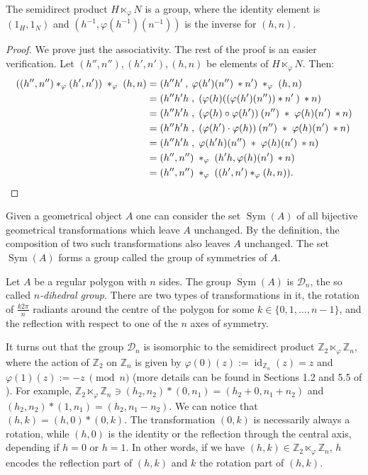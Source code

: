 \documentclass[mat1]{fmfdeloTS2.0}
\newcommand{\Z}{\mathbb Z}
\DeclareMathOperator{\id}{\mathrm{id}}			%
\DeclareMathOperator{\Sym}{\mathrm{Sym}}		%
\begin{document}
\begin{proposition}
The semidirect product $H\ltimes_{\varphi} N$ is a group, where the identity element is $(1_H,1_N)$ and $(h^{-1},\varphi(h^{-1})(n^{-1}))$ is the inverse for $(h,n)$.
\end{proposition}
\begin{proof}
We prove just the associativity. The rest of the proof is an easier verification.
Let $(h'',n''),(h',n'),(h,n)$ be elements of $H\ltimes_\varphi N$. Then:
\begin{align*}
((h'',n'')*_\varphi(h',n'))\;*_\varphi\;(h,n)  &=(h''h'\:,\:\varphi(h')(n'')\:*n')\;*_\varphi\;(h,n) \\
      &= (h''h'h\;,\;(\varphi(h)((\varphi(h')(n''))*n'\:)\:*n)	\\
      &= (h''h'h\;,\;(\varphi(h)\circ\varphi(h'))\:(n'')\;*\;\varphi(h)(n')\:*n)	 \\
      &= (h''h'h\;,\;(\varphi(h')\cdot\varphi(h))\:(n'')\;*\;\varphi(h)(n')\:*n)	\\
      &= (h''h'h\;,\;\varphi(h'h)(n'')\;*\;\varphi(h)(n')\:*n)	\\
      &= (h'',n'')\;*_\varphi\;(h'h,\varphi(h)(n')\:*n)	\\
      &= (h'',n'')\;*_\varphi\;((h',n')*_\varphi(h,n)).\qedhere
\end{align*}
\end{proof}


\begin{example}
\label{finite dihedral groups}
Given a geometrical object $A$ one can consider the set $\Sym(A)$ of all bijective geometrical transformations which leave $A$ unchanged. By the definition, the composition of two such transformations also leaves $A$ unchanged. The set $\Sym(A)$ forms a group called the group of symmetries of $A$.

Let $A$ be a regular polygon with $n$ sides. The group $\Sym(A)$ is $\mathcal{D}_n$, the so called \emph{$n$-dihedral group}. There are two types of transformations in it, the rotation of $\frac{k2\pi}{n}$ radiants around the centre of the polygon for some $k\in\{0,1,\ldots,n-1\}$, and the reflection with respect to one of the $n$ axes of symmetry.

It turns out that the group $\mathcal{D}_n$ is isomorphic to the semidirect product $\Z_2\ltimes_{\varphi}\Z_n$, where the action of $\Z_2$ on $\Z_n$ is given by $\varphi(0)(z):=\id_{\Z_n}(z)=z$ and \mbox{$\varphi(1)(z):=-z\:\pmod n$} (more details can be found in Sections 1.2 and 5.5 of \cite{Doote}). For example, $\Z_2\ltimes_\varphi\Z_n\ni(h_2,n_2)*(0,n_1)=(h_2+0,n_1+n_2)$ and $(h_2,n_2)*(1,n_1)=(h_2,n_1-n_2)$. 
We can notice that $(h,k)=(h,0)*(0,k)$. The transformation $(0,k)$ is necessarily always a rotation, while $(h,0)$ is the identity or the reflection through the central axis, depending if $h=0$ or $h=1$. In other words, if we have $(h,k)\in\Z_2\ltimes_\varphi\Z_n$, $h$ encodes the reflection part of $(h,k)$ and $k$ the rotation part of $(h,k)$.
\end{example}
\end{document}
